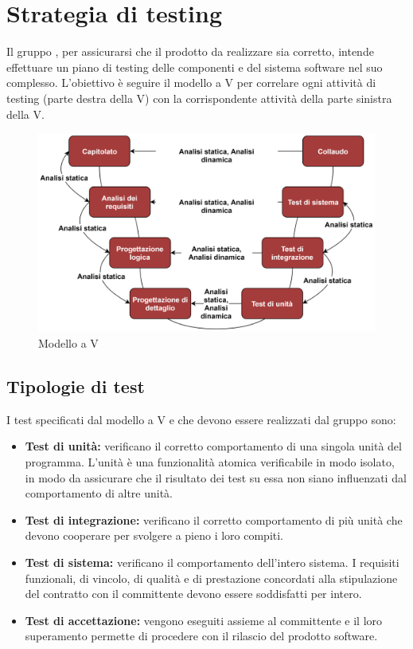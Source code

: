 \section{Strategia di testing}
Il gruppo \Gruppo{}, per assicurarsi che il prodotto da realizzare sia corretto, intende effettuare un piano di testing delle componenti e del sistema software nel suo complesso.
L'obiettivo è seguire il modello a V per correlare ogni attività di testing (parte destra della V) con la corrispondente attività della parte sinistra della V.

\begin{figure}[h]
    \centering
    \includegraphics[scale=0.85]{sezioni/Immagini/ModelloV.png}
    \caption{Modello a V}
\end{figure}

\subsection{Tipologie di test}
I test specificati dal modello a V e che devono essere realizzati dal gruppo sono:
\begin{itemize}
    \item \textbf{Test di unità:} verificano il corretto comportamento di una singola unità del programma. L'unità è una funzionalità atomica verificabile in modo isolato, in modo da assicurare che il risultato dei test su essa non siano influenzati dal comportamento di altre unità. 
    \item \textbf{Test di integrazione:} verificano il corretto comportamento di più unità che devono cooperare per svolgere a pieno i loro compiti.
    \item \textbf{Test di sistema:} verificano il comportamento dell'intero sistema. I requisiti funzionali, di vincolo, di qualità e di prestazione concordati alla stipulazione del contratto con il committente devono essere soddisfatti per intero.
    \item \textbf{Test di accettazione:} vengono eseguiti assieme al committente e il loro superamento permette di procedere con il rilascio del prodotto software.
\end{itemize}

